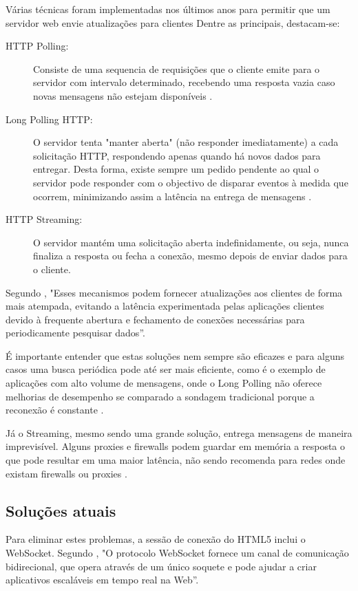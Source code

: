 Várias técnicas foram implementadas nos últimos anos para permitir que um servidor web envie atualizações para clientes Dentre as principais, destacam-se:

\begin{description}
	\item[HTTP Polling:] Consiste de uma sequencia de requisições que o cliente emite para o servidor com intervalo determinado, recebendo uma resposta vazia caso novas mensagens não estejam disponíveis \citep{Pimentel2012}.
	
	\item[Long Polling HTTP:] O servidor tenta "manter aberta" (não responder imediatamente) a cada solicitação HTTP, respondendo apenas quando há novos dados para entregar. Desta forma, existe sempre um pedido pendente ao qual o servidor pode responder com o objectivo de disparar eventos à medida que ocorrem, minimizando assim a latência na entrega de mensagens \citep{Aghaei2012}.

	\item[HTTP Streaming:] O servidor mantém uma solicitação aberta indefinidamente, ou seja, nunca finaliza a resposta ou fecha a conexão, mesmo depois de enviar dados para o cliente.
\end{description}

Segundo \citet[p.~3]{Loreto2011}, "Esses mecanismos podem fornecer atualizações aos clientes de forma mais atempada, evitando a latência experimentada pelas aplicações clientes devido à frequente abertura e fechamento de conexões necessárias para periodicamente pesquisar dados”.

É importante entender que estas soluções nem sempre são eficazes e para alguns casos uma busca periódica pode até ser mais eficiente, como é o exemplo de aplicações com alto volume de mensagens, onde o Long Polling não oferece melhorias de desempenho se comparado a sondagem tradicional porque a reconexão é constante \citep{Wang2013}.

Já o Streaming, mesmo sendo uma grande solução, entrega mensagens de maneira imprevisível. Alguns proxies e firewalls podem guardar em memória a resposta o que pode resultar em uma maior latência, não sendo recomenda para redes onde existam firewalls ou proxies \citep[p.~6]{Wang2013}.

\subsection{Soluções atuais}

Para eliminar estes problemas, a sessão de conexão do HTML5 inclui o WebSocket. Segundo \citet[p.~47, Tradução~nossa]{Pimentel2012}, "O protocolo WebSocket fornece um canal de comunicação bidirecional, que opera através de um único soquete e pode ajudar a criar aplicativos escaláveis em tempo real na Web”.

